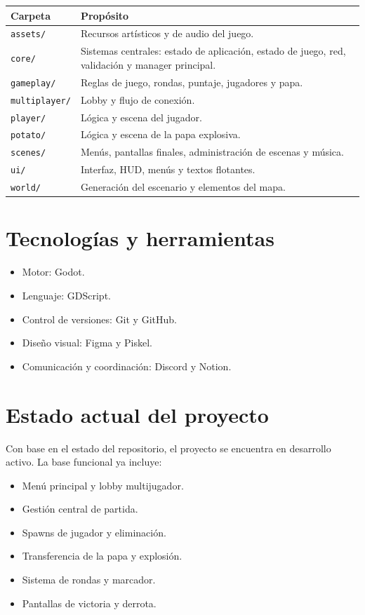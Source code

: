 \documentclass[11pt,a4paper]{article}
\begin{document}
\begin{longtable}{|>{\raggedright\arraybackslash}p{3.3cm}|p{10cm}|}
\hline
\textbf{Carpeta} & \textbf{Propósito} \\
\hline
\endhead
\texttt{assets/} & Recursos artísticos y de audio del juego. \\
\hline
\texttt{core/} & Sistemas centrales: estado de aplicación, estado de juego, red, validación y manager principal. \\
\hline
\texttt{gameplay/} & Reglas de juego, rondas, puntaje, jugadores y papa. \\
\hline
\texttt{multiplayer/} & Lobby y flujo de conexión. \\
\hline
\texttt{player/} & Lógica y escena del jugador. \\
\hline
\texttt{potato/} & Lógica y escena de la papa explosiva. \\
\hline
\texttt{scenes/} & Menús, pantallas finales, administración de escenas y música. \\
\hline
\texttt{ui/} & Interfaz, HUD, menús y textos flotantes. \\
\hline
\texttt{world/} & Generación del escenario y elementos del mapa. \\
\hline
\end{longtable}

\section{Tecnologías y herramientas}
\begin{itemize}[nosep]
    \item Motor: Godot.
    \item Lenguaje: GDScript.
    \item Control de versiones: Git y GitHub.
    \item Diseño visual: Figma y Piskel.
    \item Comunicación y coordinación: Discord y Notion.
\end{itemize}

\section{Estado actual del proyecto}
Con base en el estado del repositorio, el proyecto se encuentra en desarrollo activo. La base funcional ya incluye:
\begin{itemize}[nosep]
    \item Menú principal y lobby multijugador.
    \item Gestión central de partida.
    \item Spawns de jugador y eliminación.
    \item Transferencia de la papa y explosión.
    \item Sistema de rondas y marcador.
    \item Pantallas de victoria y derrota.
\end{itemize}
\end{document}
